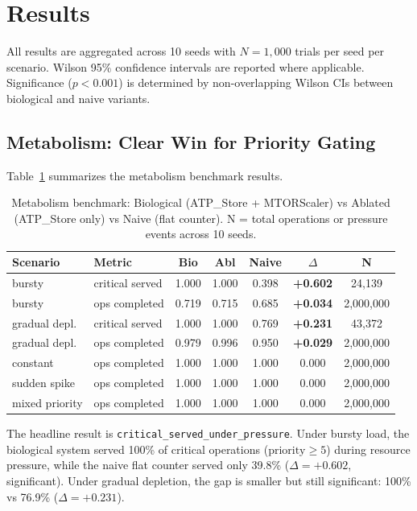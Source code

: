 \section{Results}\label{sec:results}

All results are aggregated across 10 seeds with $N = 1{,}000$ trials
per seed per scenario.  Wilson 95\% confidence intervals are reported
where applicable.  Significance ($p < 0.001$) is determined by
non-overlapping Wilson CIs between biological and naive variants.

\subsection{Metabolism: Clear Win for Priority Gating}

Table~\ref{tab:metabolism} summarizes the metabolism benchmark results.

\begin{table}[h]
\caption{Metabolism benchmark: Biological (ATP\_Store + MTORScaler) vs Ablated (ATP\_Store only) vs Naive (flat counter). N = total operations or pressure events across 10 seeds.}
\label{tab:metabolism}
\centering
\small
\begin{tabular}{llccccc}
\toprule
Scenario & Metric & Bio & Abl & Naive & $\Delta$ & N \\
\midrule
bursty & critical served & 1.000 & 1.000 & 0.398 & \textbf{+0.602} & 24{,}139 \\
bursty & ops completed & 0.719 & 0.715 & 0.685 & \textbf{+0.034} & 2{,}000{,}000 \\
gradual depl. & critical served & 1.000 & 1.000 & 0.769 & \textbf{+0.231} & 43{,}372 \\
gradual depl. & ops completed & 0.979 & 0.996 & 0.950 & \textbf{+0.029} & 2{,}000{,}000 \\
constant & ops completed & 1.000 & 1.000 & 1.000 & 0.000 & 2{,}000{,}000 \\
sudden spike & ops completed & 1.000 & 1.000 & 1.000 & 0.000 & 2{,}000{,}000 \\
mixed priority & ops completed & 1.000 & 1.000 & 1.000 & 0.000 & 2{,}000{,}000 \\
\bottomrule
\end{tabular}
\end{table}

The headline result is \texttt{critical\_served\_under\_pressure}.  Under
bursty load, the biological system served 100\% of critical operations
($\text{priority} \geq 5$) during resource pressure, while the naive
flat counter served only 39.8\% ($\Delta = +0.602$, significant).  Under
gradual depletion, the gap is smaller but still significant: 100\% vs
76.9\% ($\Delta = +0.231$).

